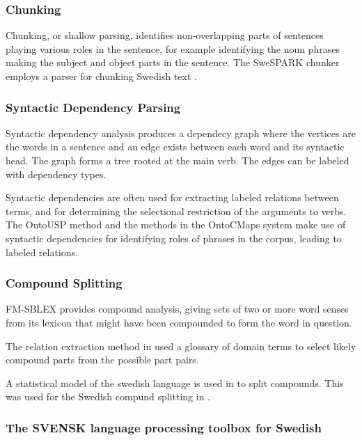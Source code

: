 \documentclass[a4paper]{report}
\begin{document}
\subsubsection{Chunking}

Chunking, or shallow parsing, identifies non-overlapping parts of sentences playing various roles in the sentence, for example identifying the noun phrases making the subject and object parts in the sentence.
The SweSPARK chunker employs a parser for chunking Swedish text \cite{Megyesi02Thesis}.

\subsubsection{Syntactic Dependency Parsing}

Syntactic dependency analysis produces a dependecy graph where the vertices are the words in a sentence and an edge exists between each word and its syntactic head.
The graph forms a tree rooted at the main verb.
The edges can be labeled with dependency types.

Syntactic dependencies are often used for extracting labeled relations between terms, and for determining the selectional restriction of the arguments to verbs.
The OntoUSP \citep{Poon2010OntoUSP} method and the methods in the OntoCMaps system \citep{Zouaq11OntoCmaps} make use of syntactic dependencies for identifying roles of phrases in the corpus, leading to labeled relations.

\subsubsection{Compound Splitting}

FM-SBLEX provides compound analysis, giving sets of two or more word senses from its lexicon that might have been compounded to form the word in question.

The relation extraction method in \cite{Kokkinakis08SolidComp} used a glossary of domain terms to select likely compound parts from the possible part pairs.

A statistical model of the swedish language is used in \citep{Sjobergh04Compounds} to split compounds. This was used for the Swedish compund splitting in \citep{Hjelm09Thesis}.

\subsubsection{The SVENSK language processing toolbox for Swedish}
\label{sec:background:svensk}
\end{document}
